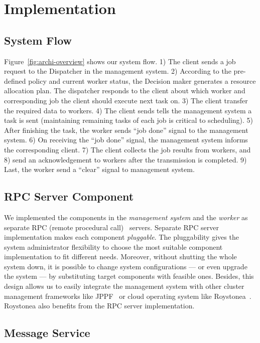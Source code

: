\chapter{Implementation}\label{sec:impl}  %

\section{System Flow}	%

Figure~\ref{fig:archi-overview} shows our system flow.
1) The client sends a job request to the Dispatcher in the management 
system.
2) According to the pre-defined policy and current worker status, the 
Decision maker generates a resource allocation plan.
The dispatcher responds to the client about which worker and
corresponding job the client should execute next task on.
3) The client transfer the required data to workers.
4) The client sends tells the management system a task is sent
(maintaining remaining tasks of each job is critical to scheduling).
5) After finishing the task, the worker sends ``job done'' signal to the
management system.
6) On receiving the ``job done'' signal,  the management system informs
the corresponding client.
7) The client collects the job results from workers, and
8) send an acknowledgement to workers after the transmission is 
completed.
9) Last, the worker send a ``clear'' signal to management system.

\section{RPC Server Component}

We implemented the components in the {\em management system} and the
{\em worker} as separate RPC (remote procedural call)~\cite{cite:RPC}
servers.
Separate RPC server implementation makes each component {\em pluggable}.
The pluggability gives the system administrator flexibility to choose
the most suitable component implementation to fit different needs.
Moreover, without shutting the whole system down, it is possible to
change system configurations --- or even upgrade the system --- by
substituting target components with feasible ones.
Besides, this design allows us to easily integrate the management system
with other cluster management frameworks like JPPF~\cite{cite:JPPF} or
cloud operating system like Roystonea~\cite{cite:roystonea}.
Roystonea also benefits from the RPC server implementation.

\section{Message Service} %

